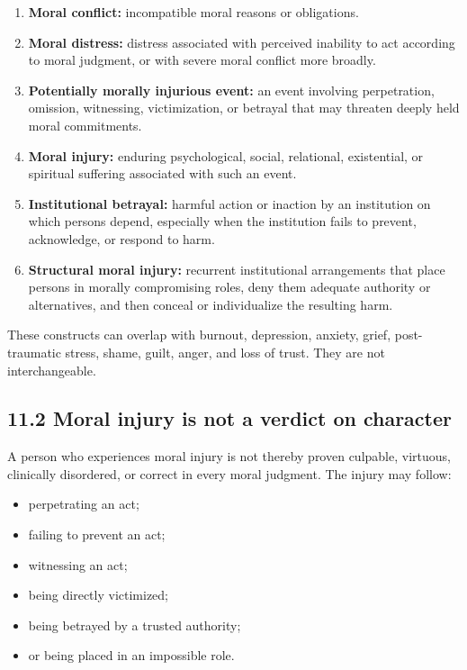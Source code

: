 \documentclass[
  11pt,
]{article}
\providecommand{\tightlist}{%
  \setlength{\itemsep}{0pt}\setlength{\parskip}{0pt}}
\begin{document}
\begin{enumerate}
\def\labelenumi{\arabic{enumi}.}
\tightlist
\item
  \textbf{Moral conflict:} incompatible moral reasons or obligations.
\item
  \textbf{Moral distress:} distress associated with perceived inability
  to act according to moral judgment, or with severe moral conflict more
  broadly.
\item
  \textbf{Potentially morally injurious event:} an event involving
  perpetration, omission, witnessing, victimization, or betrayal that
  may threaten deeply held moral commitments.
\item
  \textbf{Moral injury:} enduring psychological, social, relational,
  existential, or spiritual suffering associated with such an event.
\item
  \textbf{Institutional betrayal:} harmful action or inaction by an
  institution on which persons depend, especially when the institution
  fails to prevent, acknowledge, or respond to harm.
\item
  \textbf{Structural moral injury:} recurrent institutional arrangements
  that place persons in morally compromising roles, deny them adequate
  authority or alternatives, and then conceal or individualize the
  resulting harm.
\end{enumerate}

These constructs can overlap with burnout, depression, anxiety, grief,
post-traumatic stress, shame, guilt, anger, and loss of trust. They are
not interchangeable.

\subsection{11.2 Moral injury is not a verdict on
character}\label{moral-injury-is-not-a-verdict-on-character}

A person who experiences moral injury is not thereby proven culpable,
virtuous, clinically disordered, or correct in every moral judgment. The
injury may follow:

\begin{itemize}
\tightlist
\item
  perpetrating an act;
\item
  failing to prevent an act;
\item
  witnessing an act;
\item
  being directly victimized;
\item
  being betrayed by a trusted authority;
\item
  or being placed in an impossible role.
\end{itemize}
\end{document}
